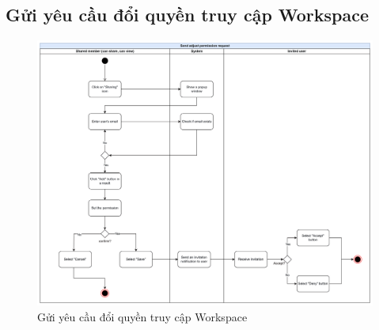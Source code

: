 \subsection{Gửi yêu cầu đổi quyền truy cập Workspace}
    \begin{figure}[H]
        \centering
        \includegraphics[width=\linewidth]{Content/Phân tích và thiết kế hệ thống/documents/Sơ đồ hoạt động/images/sendAdjustPermissionRequest.png}
        \vspace{0.5cm}
        \caption{Gửi yêu cầu đổi quyền truy cập Workspace}
        \label{fig:Gửi yêu cầu đổi quyền truy cập Workspace}
    \end{figure}